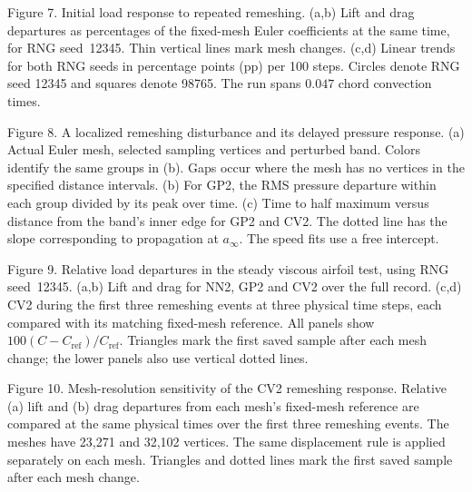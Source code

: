 Figure 7. Initial load response to repeated remeshing. (a,b) Lift and drag departures as percentages of the fixed-mesh Euler coefficients at the same time, for RNG seed~12345. Thin vertical lines mark mesh changes. (c,d) Linear trends for both RNG seeds in percentage points (pp) per 100 steps. Circles denote RNG seed 12345 and squares denote 98765. The run spans $0.047$ chord convection times.

Figure 8. A localized remeshing disturbance and its delayed pressure response. (a) Actual Euler mesh, selected sampling vertices and perturbed band. Colors identify the same groups in (b). Gaps occur where the mesh has no vertices in the specified distance intervals. (b) For GP2, the RMS pressure departure within each group divided by its peak over time. (c) Time to half maximum versus distance from the band's inner edge for GP2 and CV2. The dotted line has the slope corresponding to propagation at $a_\infty$. The speed fits use a free intercept.

Figure 9. Relative load departures in the steady viscous airfoil test, using RNG seed~12345. (a,b) Lift and drag for NN2, GP2 and CV2 over the full record. (c,d) CV2 during the first three remeshing events at three physical time steps, each compared with its matching fixed-mesh reference. All panels show $100(C-C_{\mathrm{ref}})/C_{\mathrm{ref}}$. Triangles mark the first saved sample after each mesh change; the lower panels also use vertical dotted lines.

Figure 10. Mesh-resolution sensitivity of the CV2 remeshing response. Relative (a) lift and (b) drag departures from each mesh's fixed-mesh reference are compared at the same physical times over the first three remeshing events. The meshes have 23,271 and 32,102 vertices. The same displacement rule is applied separately on each mesh. Triangles and dotted lines mark the first saved sample after each mesh change.
